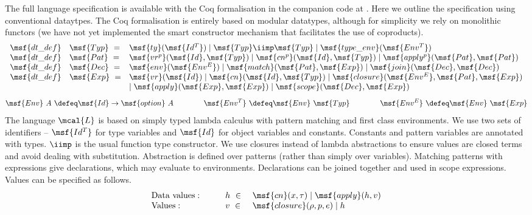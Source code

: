 \documentclass[submission,copyright,creativecommons]{eptcs}
\begin{document}
The full language specification is available with the Coq
formalisation in the companion code at \cite{MACoq}. Here we outline
the specification using conventional dataytpes. The Coq formalisation
is entirely based on modular datatypes, although for simplicity we
rely on monolithic functors (we have not yet implemented the smart
constructor mechanism that facilitates the use of coproducts).
\begin{gather}  
\begin{array}{llll}
 \msf{dt\_def} & \msf{Typ} \ = & \msf{ty}(\msf{Id^T}) \mid \msf{Typ}
 \iimp \msf{Typ} \mid \msf{type\_env} (\msf{Env^T}) \\
\msf{dt\_def} & \msf{Pat} \ = & \msf{vr^p}(\msf{Id},\msf{Typ}) \mid
 \msf{cn^p}(\msf{Id},\msf{Typ}) \mid \msf{apply^p}(\msf{Pat},
 \msf{Pat}) \\
\msf{dt\_def} & \msf{Dec} \ = & \msf{env}(\msf{Env^E}) \mid
 \msf{match}(\msf{Pat}, \msf{Exp}) \mid \msf{join}(\msf{Dec},
 \msf{Dec}) \\
\msf{dt\_def} & \msf{Exp} \ = & \msf{vr}(\msf{Id}) \mid
 \msf{cn}(\msf{Id},\msf{Typ}) \mid \msf{closure}(\msf{Env^E}, \msf{Pat},
 \msf{Exp})  \\ & & 
  \mid \msf{apply}(\msf{Exp}, \msf{Exp}) \mid
 \msf{scope}(\msf{Dec}, \msf{Exp}) 
\end{array}
 \end{gather} 
\begin{gather}
\msf{Env} \ A \ \defeq \msf{Id} \to \msf{option} \ A
\qquad \qquad \msf{Env^T} \ \defeq \msf{Env} \ \msf{Typ} 
\qquad \qquad \msf{Env^E} \ \defeq \msf{Env} \ \msf{Exp}
\end{gather} 
The language $\mcal{L}$ is based on simply typed lambda calculus with
pattern matching and first class environments. We use two sets of
identifiers -- $\msf{Id^T}$ for type variables and $\msf{Id}$ for
object variables and constants. Constants and pattern variables are
annotated with types. $\iimp$ is the usual function type
constructor. We use closures instead of lambda abstractions to ensure
values are closed terms and avoid dealing with
substitution. Abstraction is defined over patterns (rather than simply
over variables). Matching patterns with expressions give declarations,
which may evaluate to environments. Declarations can be joined
together and used in scope expressions. Values can be specified as
follows.
\begin{gather}  
\begin{array}{llll}
\mbox{Data values}: \qquad & h \ \in & \ \msf{cn}(x,\tau) \mid
\msf{apply}(h, v) \\
\mbox{Values}: \qquad & v \ \in &
\ \msf{closure}(\rho, p, e) \mid h
\end{array}
 \end{gather} 
\end{document}
